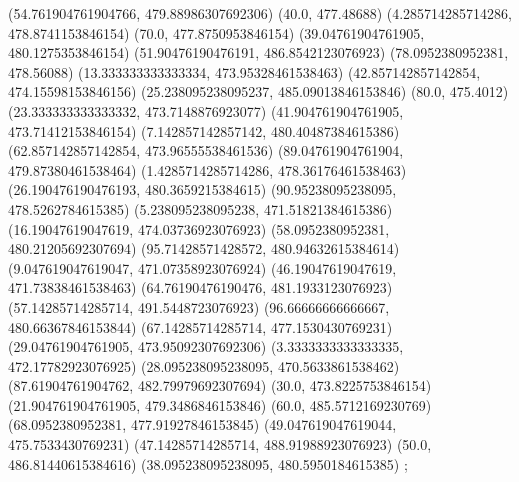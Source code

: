 {{{		(54.761904761904766, 479.88986307692306)
		(40.0, 477.48688)
		(4.285714285714286, 478.8741153846154)
		(70.0, 477.8750953846154)
		(39.04761904761905, 480.1275353846154)
		(51.90476190476191, 486.8542123076923)
		(78.0952380952381, 478.56088)
		(13.333333333333334, 473.95328461538463)
		(42.857142857142854, 474.15598153846156)
		(25.238095238095237, 485.09013846153846)
		(80.0, 475.4012)
		(23.333333333333332, 473.7148876923077)
		(41.904761904761905, 473.71412153846154)
		(7.142857142857142, 480.40487384615386)
		(62.857142857142854, 473.96555538461536)
		(89.04761904761904, 479.87380461538464)
		(1.4285714285714286, 478.36176461538463)
		(26.190476190476193, 480.3659215384615)
		(90.95238095238095, 478.5262784615385)
		(5.238095238095238, 471.51821384615386)
		(16.19047619047619, 474.03736923076923)
		(58.0952380952381, 480.21205692307694)
		(95.71428571428572, 480.94632615384614)
		(9.047619047619047, 471.07358923076924)
		(46.19047619047619, 471.73838461538463)
		(64.76190476190476, 481.1933123076923)
		(57.14285714285714, 491.5448723076923)
		(96.66666666666667, 480.66367846153844)
		(67.14285714285714, 477.1530430769231)
		(29.04761904761905, 473.95092307692306)
		(3.3333333333333335, 472.17782923076925)
		(28.095238095238095, 470.5633861538462)
		(87.61904761904762, 482.79979692307694)
		(30.0, 473.8225753846154)
		(21.904761904761905, 479.3486846153846)
		(60.0, 485.5712169230769)
		(68.0952380952381, 477.91927846153845)
		(49.047619047619044, 475.7533430769231)
		(47.14285714285714, 488.91988923076923)
		(50.0, 486.81440615384616)
		(38.095238095238095, 480.5950184615385)
	};

}}
